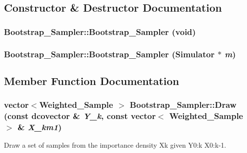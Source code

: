\subsection{Constructor \& Destructor Documentation}
\hypertarget{class_bootstrap___sampler_bf03144ecc96fdc63267d050ed91e71b}{
\subsubsection[{Bootstrap\_\-Sampler}]{\setlength{\rightskip}{0pt plus 5cm}Bootstrap\_\-Sampler::Bootstrap\_\-Sampler (void)}}
\label{class_bootstrap___sampler_bf03144ecc96fdc63267d050ed91e71b}


\hypertarget{class_bootstrap___sampler_484a287a562f6f3801d5547cfff0b757}{
\subsubsection[{Bootstrap\_\-Sampler}]{\setlength{\rightskip}{0pt plus 5cm}Bootstrap\_\-Sampler::Bootstrap\_\-Sampler ({\bf Simulator} $\ast$ {\em m})}}
\label{class_bootstrap___sampler_484a287a562f6f3801d5547cfff0b757}




\subsection{Member Function Documentation}
\hypertarget{class_bootstrap___sampler_a826164a46c257f5a95ba0b4eba7ee83}{
\subsubsection[{Draw}]{\setlength{\rightskip}{0pt plus 5cm}vector$<${\bf Weighted\_\-Sample} $>$ Bootstrap\_\-Sampler::Draw (const dcovector \& {\em Y\_\-k}, \/  const vector$<$ {\bf Weighted\_\-Sample} $>$ \& {\em X\_\-km1})}}
\label{class_bootstrap___sampler_a826164a46c257f5a95ba0b4eba7ee83}


Draw a set of samples from the importance density Xk given Y0:k X0:k-1. 

